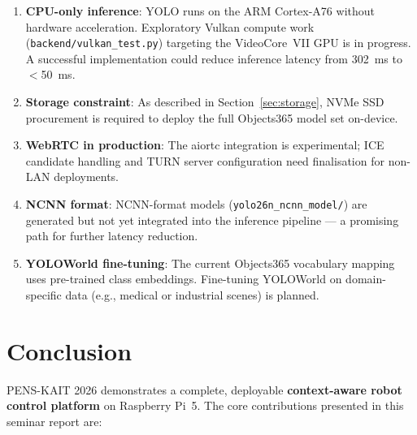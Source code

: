 \documentclass[12pt,a4paper]{article}
\begin{document}
\begin{enumerate}[leftmargin=*, label=\textbf{L\arabic*.}]

  \item \textbf{CPU-only inference}: YOLO runs on the ARM Cortex-A76 without
        hardware acceleration. Exploratory Vulkan compute work
        (\texttt{backend/vulkan\_test.py}) targeting the VideoCore~VII GPU
        is in progress. A successful implementation could reduce inference
        latency from 302~ms to $<$50~ms.

  \item \textbf{Storage constraint}: As described in Section~\ref{sec:storage},
        NVMe SSD procurement is required to deploy the full Objects365 model
        set on-device.

  \item \textbf{WebRTC in production}: The aiortc integration is experimental;
        ICE candidate handling and TURN server configuration need finalisation
        for non-LAN deployments.

  \item \textbf{NCNN format}: NCNN-format models
        (\texttt{yolo26n\_ncnn\_model/}) are generated but not yet integrated
        into the inference pipeline — a promising path for further latency
        reduction.

  \item \textbf{YOLOWorld fine-tuning}: The current Objects365 vocabulary
        mapping uses pre-trained class embeddings. Fine-tuning
        YOLOWorld on domain-specific data (e.g., medical or industrial scenes)
        is planned.

\end{enumerate}

\section{Conclusion}

PENS-KAIT 2026 demonstrates a complete, deployable \textbf{context-aware robot
control platform} on Raspberry Pi~5. The core contributions presented in this
seminar report are:
\end{document}
